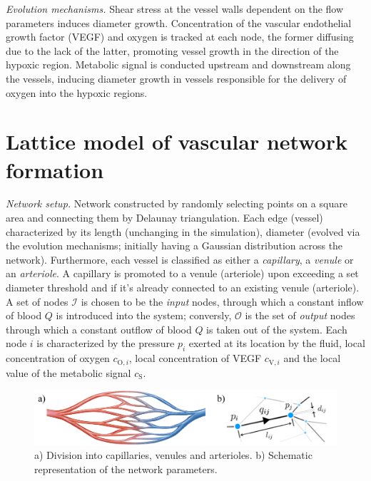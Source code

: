 \documentclass[aps,pra,a4paper,twocolumn,10pt,superscriptaddress,longbibliography]{revtex4-1}
\newcommand{\ox}{\textrm{O}}
\newcommand{\vegf}{\textrm{V}}
\newcommand{\sig}{\textrm{S}}
\begin{document}
%
\emph{Evolution mechanisms.} Shear stress at the vessel walls dependent on the flow parameters induces diameter growth. Concentration of the vascular endothelial growth factor (VEGF) and oxygen is tracked at each node, the former diffusing due to the lack of the latter, promoting vessel growth in the direction of the hypoxic region. Metabolic signal is conducted upstream and downstream along the vessels, inducing diameter growth in vessels responsible for the delivery of oxygen into the hypoxic regions.

%
\section{Lattice model of vascular network formation}
\label{sec:model}
%
\emph{Network setup.} Network constructed by randomly selecting points on a square area and connecting them by Delaunay triangulation. Each edge (vessel) characterized by its length (unchanging in the simulation), diameter (evolved via the evolution mechanisms; initially having a Gaussian distribution across the network). Furthermore, each vessel is classified as either a \emph{capillary}, a \emph{venule} or an \emph{arteriole}. A capillary is promoted to a venule (arteriole) upon exceeding a set diameter threshold and if it's already connected to an existing venule (arteriole). A set of nodes $\mathcal{I}$ is chosen to be the \emph{input} nodes, through which a constant inflow of blood $Q$ is introduced into the system; conversly, $\mathcal{O}$ is the set of \emph{output} nodes through which a constant outflow of blood $Q$ is taken out of the system. Each node $i$ is characterized by the pressure $p_i$ exerted at its location by the fluid, local concentration of oxygen $c_{\ox,i}$, local concentration of VEGF $c_{\vegf,i}$ and the local value of the metabolic signal $c_\sig$.
\begin{figure}[h!]
\centering
\includegraphics[width=\columnwidth]{fig1_vessel-division_schematic.png}
\caption{a) Division into capillaries, venules and arterioles. b) Schematic representation of the network parameters.}
\label{fig:division}
\end{figure}
%
\end{document}

